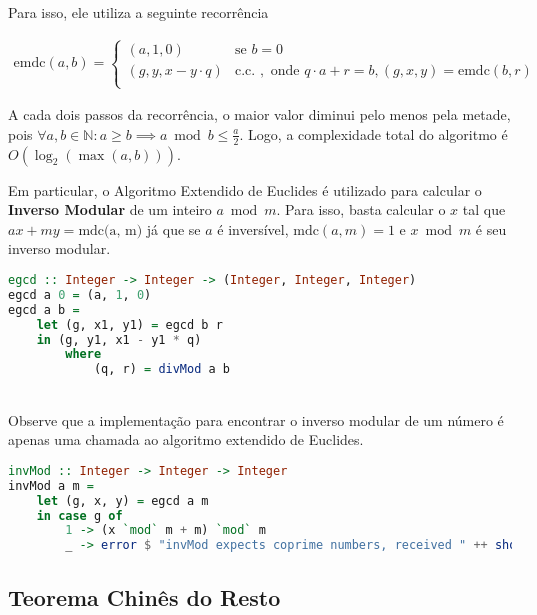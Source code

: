\documentclass{article}
\begin{document}
Para isso, ele utiliza a seguinte recorrência

\begin{align*}
  \text{emdc}(a, b) = \begin{cases}
    (a, 1, 0) & \text{se } b = 0 \\
    (g, y, x - y \cdot q) & \text{c.c. }, \text{ onde } q \cdot a + r = b, (g, x, y) = \text{emdc}(b, r) \\
\end{cases}
\end{align*}

A cada dois passos da recorrência, o maior valor diminui pelo menos pela metade, pois $\forall a, b \in \mathbb{N} \colon a \geq b \implies a \bmod b \leq \frac{a}{2}$. Logo, a complexidade total do algoritmo é $O(\log_2(\max (a, b)))$.

Em particular, o Algoritmo Extendido de Euclides é utilizado para calcular o \textbf{Inverso Modular} de um inteiro $a \bmod m$. Para isso, basta calcular o $x$ tal que $ax + my = \text{mdc(a, m)}$ já que se $a$ é inversível, $\text{mdc}(a, m) = 1$ e $x \bmod m$ é seu inverso modular.


\begin{minipage}{.9\linewidth}
\begin{lstlisting}[language=haskell,caption=Algoritmo Extendido de Euclides]
egcd :: Integer -> Integer -> (Integer, Integer, Integer)
egcd a 0 = (a, 1, 0)
egcd a b =
    let (g, x1, y1) = egcd b r
    in (g, y1, x1 - y1 * q)
        where
            (q, r) = divMod a b
\end{lstlisting}
\end{minipage} \\
Observe que a implementação para encontrar o inverso modular de um número é apenas uma chamada ao algoritmo extendido de Euclides.

\begin{minipage}{.9\linewidth}
\begin{lstlisting}[language=haskell,caption=Inverso Modular]
invMod :: Integer -> Integer -> Integer
invMod a m =
    let (g, x, y) = egcd a m
    in case g of
        1 -> (x `mod` m + m) `mod` m
        _ -> error $ "invMod expects coprime numbers, received " ++ show a ++ " " ++ show m    
\end{lstlisting}
\end{minipage} 
    
\subsection{Teorema Chinês do Resto}
\end{document}
